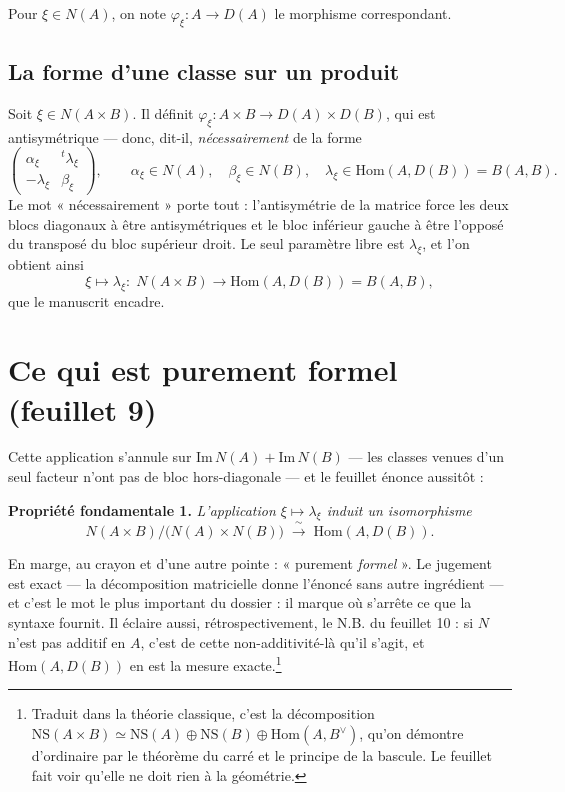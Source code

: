 \documentclass[11pt,a4paper]{article}
\begin{document}
Pour $\xi \in N(A)$, on note $\varphi_{\xi} : A \to D(A)$ le morphisme
correspondant.

\subsection*{La forme d'une classe sur un produit}

Soit $\xi \in N(A \times B)$. Il définit $\varphi_{\xi} : A \times B \to D(A)
\times D(B)$, qui est antisymétrique — donc, dit-il, \emph{nécessairement} de
la forme
\[
  \begin{pmatrix}
    \alpha_{\xi} & {}^{t}\lambda_{\xi} \\
    -\lambda_{\xi} & \beta_{\xi}
  \end{pmatrix},
  \qquad \alpha_{\xi} \in N(A), \quad \beta_{\xi} \in N(B), \quad
  \lambda_{\xi} \in \mathrm{Hom}(A, D(B)) = B(A,B).
\]
Le mot « nécessairement » porte tout : l'antisymétrie de la matrice force les
deux blocs diagonaux à être antisymétriques et le bloc inférieur gauche à être
l'opposé du transposé du bloc supérieur droit. Le seul paramètre libre est
$\lambda_{\xi}$, et l'on obtient ainsi
\[
  \xi \longmapsto \lambda_{\xi} : \; N(A \times B) \longrightarrow
  \mathrm{Hom}(A, D(B)) = B(A,B),
\]
que le manuscrit encadre.

\section*{Ce qui est purement formel (feuillet 9)}

Cette application s'annule sur $\mathrm{Im}\,N(A) + \mathrm{Im}\,N(B)$ — les
classes venues d'un seul facteur n'ont pas de bloc hors-diagonale — et le
feuillet énonce aussitôt :

\textbf{Propriété fondamentale 1.} \emph{L'application $\xi \mapsto
\lambda_{\xi}$ induit un isomorphisme}
\[
  N(A \times B) \big/ \bigl(N(A) \times N(B)\bigr)
  \;\xrightarrow{\ \sim\ }\; \mathrm{Hom}(A, D(B)).
\]

En marge, au crayon et d'une autre pointe : « purement \emph{formel} ». Le
jugement est exact — la décomposition matricielle donne l'énoncé sans autre
ingrédient — et c'est le mot le plus important du dossier : il marque où
s'arrête ce que la syntaxe fournit. Il éclaire aussi, rétrospectivement, le
N.B. du feuillet 10 : si $N$ n'est pas additif en $A$, c'est de cette
non-additivité-là qu'il s'agit, et $\mathrm{Hom}(A, D(B))$ en est la mesure
exacte.\footnote{Traduit dans la théorie classique, c'est la décomposition
$\mathrm{NS}(A \times B) \simeq \mathrm{NS}(A) \oplus \mathrm{NS}(B) \oplus
\mathrm{Hom}(A, B^{\vee})$, qu'on démontre d'ordinaire par le théorème du
carré et le principe de la bascule. Le feuillet fait voir qu'elle
ne doit rien à la géométrie.}
\end{document}
